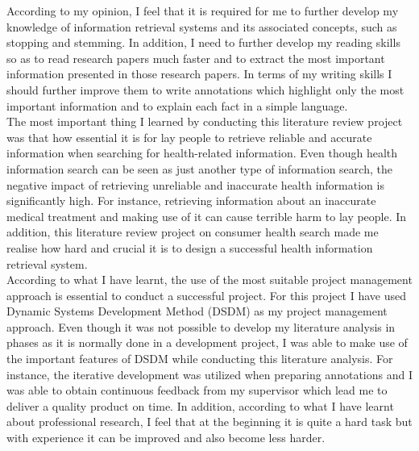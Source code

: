 \documentclass[]{article}
\begin{document}
According to my opinion, I feel that it is required for me to further develop my knowledge of information retrieval systems and its associated concepts, such as stopping and stemming. In addition, I need to further develop my reading skills so as to read research papers much faster and to extract the most important information presented in those research papers. In terms of my writing skills I should further improve them to write annotations which highlight only the most important information and to explain each fact in a simple language. \\
      
The most important thing I learned by conducting this literature review project was that how essential it is for lay people to retrieve reliable and accurate information when searching for health-related information. Even though health information search can be seen as just another type of information search, the negative impact of retrieving unreliable and inaccurate health information is significantly high. For instance, retrieving information about an inaccurate medical treatment and making use of it can cause terrible harm to lay people. In addition, this literature review project on consumer health search made me realise how hard and crucial it is to design a successful health information retrieval system. \\
     
According to what I have learnt, the use of the most suitable project management approach is essential to conduct a successful project. For this project I have used Dynamic Systems Development Method (DSDM) as my project management approach. Even though it was not possible to develop my literature analysis in phases as it is normally done in a development project, I was able to make use of the important features of DSDM while conducting this literature analysis. For instance, the iterative development was utilized when preparing annotations and I was able to obtain continuous feedback from my supervisor which lead me to deliver a quality product on time. In addition, according to what I have learnt about professional research, I feel that at the beginning it is quite a hard task but with experience it can be improved and also become less harder. \\
\end{document}
